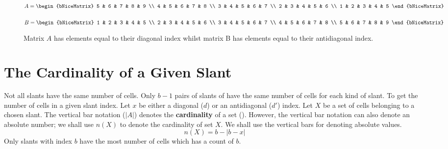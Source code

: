 \documentclass[twoside,openany,12pt]{book}
\begin{document}
    \begin{figure}[h]
        \centering
        \begin{minipage}{0.45\textwidth}
            \centering
            {$
            A =
            \begin{bNiceMatrix}
                5 & 6 & 7 & 8 & 9 \\
                4 & 5 & 6 & 7 & 8 \\
                3 & 4 & 5 & 6 & 7 \\
                2 & 3 & 4 & 5 & 6 \\
                1 & 2 & 3 & 4 & 5
            \end{bNiceMatrix}
            $}
        \end{minipage}
        \hfill
        \begin{minipage}{0.45\textwidth}
            \centering
            {$
            B =
            \begin{bNiceMatrix}
                1 & 2 & 3 & 4 & 5 \\
                2 & 3 & 4 & 5 & 6 \\
                3 & 4 & 5 & 6 & 7 \\
                4 & 5 & 6 & 7 & 8 \\
                5 & 6 & 7 & 8 & 9
            \end{bNiceMatrix}
            $}
        \end{minipage}
        \caption{Matrix $A$ has elements equal to their diagonal index whilst matrix B has elements equal to their antidiagonal index.}
    \end{figure}

    \section{The Cardinality of a Given Slant} \label{slant_cardinality}
    Not all slants have the same number of cells. Only $b-1$ pairs of slants of have the same number of cells for each kind of slant. To get the number of cells in a given slant index. Let $x$ be either a diagonal ($d$) or an antidiagonal ($d'$) index. Let $X$ be a set of cells belonging to a chosen slant. The vertical bar notation ($|A|$) denotes the \textbf{cardinality} of a set (\cite{math_vault}). However, the vertical bar notation can also denote an absolute number; we shall use $n(X)$ to denote the cardinality of set $X$. We shall use the vertical bars for denoting absolute values.
    \begin{equation}
        n(X) = b - |b - x|
    \end{equation}
    Only slants with index $b$ have the most number of cells which has a count of $b$.
\end{document}
